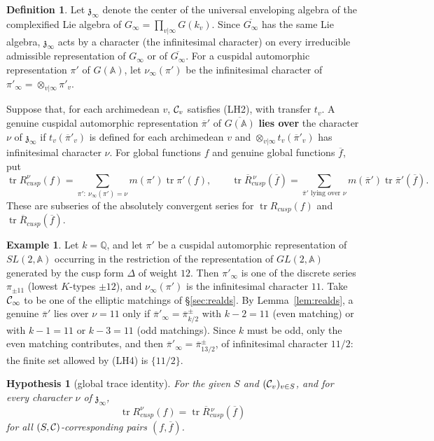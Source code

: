 \documentclass[12pt,letterpaper]{book}
\theoremstyle{plain}
\newtheorem{hypothesis}[theorem]{Hypothesis}
\theoremstyle{definition}
\newtheorem{definition}[theorem]{Definition}
\newtheorem{example}[theorem]{Example}
\theoremstyle{remark}
\theoremstyle{remark}
\newcommand{\tr}{\operatorname{tr}}
\begin{document}
\begin{definition}\label{def:infchar}
Let $\mathfrak{z}_\infty$ denote the center of the universal enveloping
algebra of the complexified Lie algebra of
$G_\infty=\prod_{v|\infty}G(k_v)$. Since $\overline{G_\infty}$ has the same
Lie algebra, $\mathfrak{z}_\infty$ acts by a character (the infinitesimal
character) on every irreducible admissible representation of $G_\infty$
or of $\overline{G_\infty}$. For a cuspidal automorphic representation
$\pi'$ of $G({\mathbb{A}})$, let $\nu_\infty(\pi')$ be the infinitesimal
character of $\pi'_\infty=\otimes_{v|\infty}\pi'_v$.

Suppose that, for each archimedean $v$, ${\cal C}_v$ satisfies (LH2), with
transfer $t_v$. A genuine cuspidal automorphic representation
$\overline\pi'$ of $\overline{G({\mathbb{A}})}$ {\bf lies over} the
character $\nu$ of $\mathfrak{z}_\infty$ if $t_v(\overline\pi'_v)$ is
defined for each archimedean $v$ and $\otimes_{v|\infty}t_v(\overline\pi'_v)$
has infinitesimal character $\nu$. For global functions $f$ and genuine
global functions $\overline f$, put
\[
\tr R_{cusp}^\nu(f)=\sum_{\pi':\ \nu_\infty(\pi')=\nu}m(\pi')\tr\pi'(f),
\qquad
\tr \overline{R}{}_{cusp}^{\,\nu}(\overline f)=
\sum_{\overline\pi'\text{ lying over }\nu}m(\overline\pi')\tr\overline\pi'(\overline f).
\]
These are subseries of the absolutely convergent series for
$\tr R_{cusp}(f)$ and $\tr\overline R_{cusp}(\overline f)$.
\end{definition}

\begin{example}
Let $k={\mathbb Q}$, and let $\pi'$ be a cuspidal automorphic
representation of $SL(2,{\mathbb A})$ occurring in the restriction of the
representation of $GL(2,{\mathbb A})$ generated by the cusp form $\Delta$
of weight $12$. Then $\pi'_\infty$ is one of the discrete series
$\pi_{\pm11}$ (lowest $K$-types $\pm12$), and $\nu_\infty(\pi')$ is the
infinitesimal character $11$. Take ${\cal C}_\infty$ to be one of the
elliptic matchings of \S\ref{sec:realds}. By Lemma~\ref{lem:realds}, a
genuine $\overline\pi'$ lies over $\nu=11$ only if
$\overline\pi'_\infty=\overline\pi{}^{\pm}_{k/2}$ with $k-2=11$ (even
matching) or with $k-1=11$ or $k-3=11$ (odd matchings). Since $k$ must
be odd, only the even matching contributes, and then
$\overline\pi'_\infty=\overline\pi{}^{\pm}_{13/2}$, of infinitesimal
character $11/2$: the finite set allowed by (LH4) is $\{11/2\}$.
\end{example}

\begin{hypothesis}[global trace identity]\label{hyp:GH}
For the given $S$ and $({\cal C}_v)_{v\in S}$, and for every character
$\nu$ of $\mathfrak{z}_\infty$,
\[
\tr R_{cusp}^\nu(f)=\tr \overline{R}{}_{cusp}^{\,\nu}(\overline{f})
\]
for all $(S,{\cal C})$-corresponding pairs $(f,\overline{f})$.
\end{hypothesis}
\end{document}
